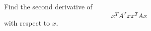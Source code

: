 \begin{exercise}
   Find the second derivative of
   \[
      x^T A^T x x^T A x
   \]
   with respect to $x$.
\end{exercise}
